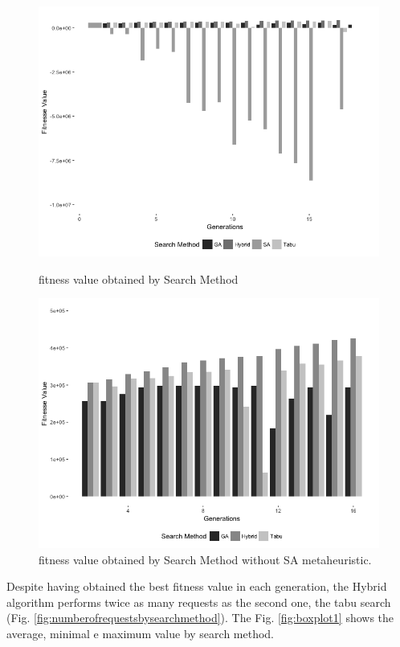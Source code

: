 \documentclass[times]{stvrauth}
\begin{document}
\begin{figure}[h]
\begin{minipage}{.5\textwidth}
\centering
\includegraphics[width=1\textwidth]{./images/experiment1-1-bw.png}
\caption{fitness value obtained by Search Method }
\label{fig:fitnessbygeneration1}
\end{minipage}
\begin{minipage}{.5\textwidth}
\centering
\includegraphics[width=1\textwidth]{./images/experiment1-2-bw.png}
\caption{fitness value obtained by Search Method without SA metaheuristic.}
\label{fig:fitnessbygeneration1-2}
\end{minipage}
\end{figure}

Despite having obtained the best fitness value in each generation, the Hybrid algorithm performs twice as many requests as the second one, the tabu search (Fig. \ref{fig:numberofrequestsbysearchmethod}). The Fig. \ref{fig:boxplot1} shows the average, minimal e maximum value by search method.
\end{document}
